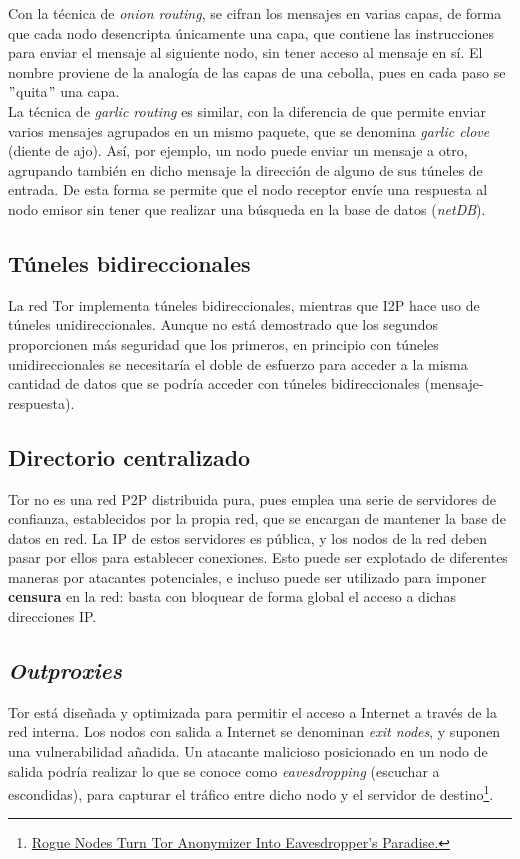    Con la técnica de \textit{onion routing}, se cifran los mensajes en varias capas, de forma que cada nodo desencripta únicamente una capa, que contiene las instrucciones para enviar el mensaje al siguiente nodo, sin tener acceso al mensaje en sí. El nombre proviene de la analogía de las capas de una cebolla, pues en cada paso se $"$quita$"$ una capa.\\
    
    
 La técnica de \textit{garlic routing} es similar, con la diferencia de que permite enviar varios mensajes agrupados en un mismo paquete, que se denomina \textit{garlic clove} (diente de ajo). Así, por ejemplo, un nodo puede enviar un mensaje a otro, agrupando también en dicho mensaje la dirección de alguno de sus túneles de entrada. De esta forma se permite que el nodo receptor envíe una respuesta al nodo emisor sin tener que realizar una búsqueda en la base de datos (\textit{netDB}).
 
 \subsection{Túneles bidireccionales}
 
 La red Tor implementa túneles bidireccionales, mientras que I2P hace uso de túneles unidireccionales. Aunque no está demostrado que los segundos proporcionen más seguridad que los primeros, en principio con túneles unidireccionales se necesitaría el doble de esfuerzo para acceder a la misma cantidad de datos que se podría acceder con túneles bidireccionales (mensaje-respuesta).
    
 \subsection{Directorio centralizado}
    Tor no es una red P2P distribuida pura, pues emplea una serie de servidores de confianza, establecidos por la propia red, que se encargan de mantener la base de datos en red. La IP de estos servidores es pública, y los nodos de la red deben pasar por ellos para establecer conexiones. Esto puede ser explotado de diferentes maneras por atacantes potenciales, e incluso puede ser utilizado para imponer \textbf{censura} en la red: basta con bloquear de forma global el acceso a dichas direcciones IP.
    
    \subsection{\textit{Outproxies}}
   Tor está diseñada y optimizada para permitir el acceso a Internet a través de la red interna. Los nodos con salida a Internet se denominan \textit{exit nodes}, y suponen una vulnerabilidad añadida. Un atacante malicioso posicionado en un nodo de salida podría realizar lo que se conoce como \textit{eavesdropping} (escuchar a escondidas), para capturar el tráfico entre dicho nodo y el servidor de destino\footnote{\href{https://www.wired.com/2007/09/rogue-nodes-turn-tor-anonymizer-into-eavesdroppers-paradise/?currentPage=all}{Rogue Nodes Turn Tor Anonymizer Into Eavesdropper's Paradise.}}.\\
   
